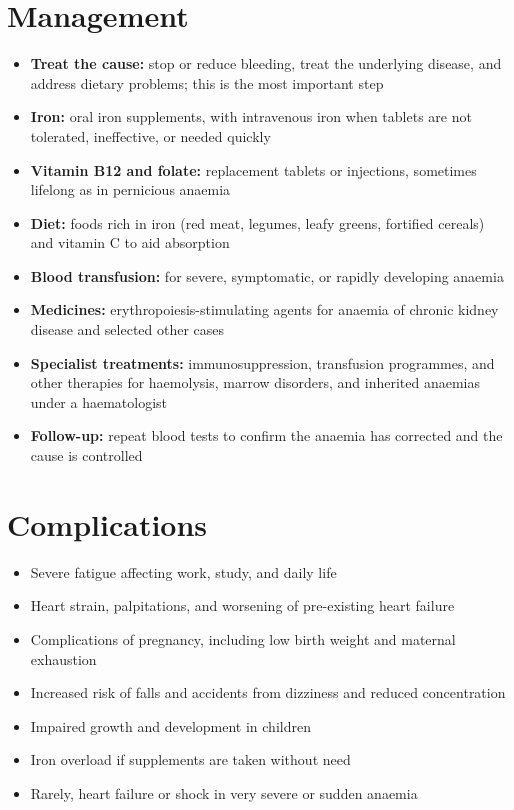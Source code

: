 \section*{Management}
\begin{itemize}
    \item \textbf{Treat the cause:} stop or reduce bleeding, treat the underlying disease, and address dietary problems; this is the most important step
    \item \textbf{Iron:} oral iron supplements, with intravenous iron when tablets are not tolerated, ineffective, or needed quickly
    \item \textbf{Vitamin B12 and folate:} replacement tablets or injections, sometimes lifelong as in pernicious anaemia
    \item \textbf{Diet:} foods rich in iron (red meat, legumes, leafy greens, fortified cereals) and vitamin C to aid absorption
    \item \textbf{Blood transfusion:} for severe, symptomatic, or rapidly developing anaemia
    \item \textbf{Medicines:} erythropoiesis-stimulating agents for anaemia of chronic kidney disease and selected other cases
    \item \textbf{Specialist treatments:} immunosuppression, transfusion programmes, and other therapies for haemolysis, marrow disorders, and inherited anaemias under a haematologist
    \item \textbf{Follow-up:} repeat blood tests to confirm the anaemia has corrected and the cause is controlled
\end{itemize}

\section*{Complications}
\begin{itemize}
    \item Severe fatigue affecting work, study, and daily life
    \item Heart strain, palpitations, and worsening of pre-existing heart failure
    \item Complications of pregnancy, including low birth weight and maternal exhaustion
    \item Increased risk of falls and accidents from dizziness and reduced concentration
    \item Impaired growth and development in children
    \item Iron overload if supplements are taken without need
    \item Rarely, heart failure or shock in very severe or sudden anaemia
\end{itemize}

